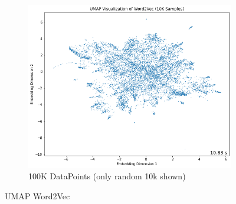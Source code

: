 \begin{itemize}
\begin{itemize}
\begin{figure}[H]
\begin{subfigure}{0.5\textwidth}
                    \includegraphics[width=\textwidth]{images/umap_word2vec100k.png}
                    \caption{100K DataPoints (only random 10k shown)}
                    \label{fig:umap_word2vec100k}
                \end{subfigure}
                \caption{UMAP Word2Vec}
                \label{fig:umap_word2vec}
            \end{figure}


    
\end{itemize}



       
	     

\end{itemize}
